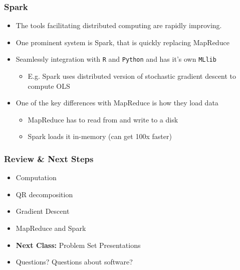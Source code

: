 \documentclass[
  shownotes,
  xcolor={svgnames},
  hyperref={colorlinks,citecolor=DarkBlue,linkcolor=DarkRed,urlcolor=DarkBlue}
  , aspectratio=169]{beamer}
\begin{document}
\begin{frame}
\frametitle{Spark}

\begin{itemize}
  \item  The tools facilitating distributed computing are rapidly improving. 
  \medskip
  \item One prominent system is Spark, that is quickly replacing MapReduce
  \medskip
  \item Seamlessly integration with \texttt{R} and \texttt{Python} and has it's own \texttt{MLlib}
  \medskip
  \begin{itemize}
   \item E.g. Spark uses distributed version of stochastic gradient descent to compute OLS  
   \medskip
    \end{itemize}       
    \item One of the key differences with MapReduce is how they load data 
    \medskip
    \begin{itemize}
     \item MapReduce has to read from and write to a disk
     \medskip
     \item Spark loads it  in-memory (can get 100x faster)
    \end{itemize}       

\end{itemize}    
  
\end{frame}



\begin{frame}
\frametitle{Review \& Next Steps}
  
  \begin{itemize} 
    \item Computation
    \item QR decomposition
    \item Gradient Descent
    \item MapReduce and Spark
  \bigskip  

  
  \item  {\bf Next Class:} Problem Set Presentations
  \bigskip
  \item Questions? Questions about software? 
  
  \end{itemize}


\end{frame}
\end{document}
